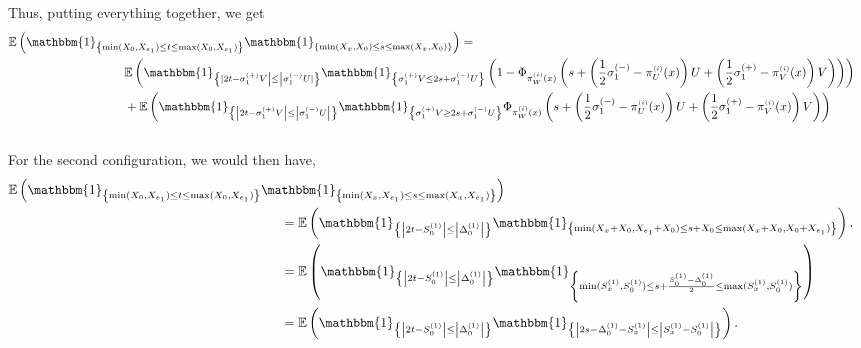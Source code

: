 \documentclass[12pt]{article}
\theoremstyle{Theorem}
\begin{document}
Thus, putting everything together, we get 
{\small 
\begin{align*}
\mathbb{E}\left(\mathbbm{1}_{\left\{\min(X_{\scriptscriptstyle 0}, X_{e_1}) \leq t \leq \max(X_{\scriptscriptstyle 0}, X_{e_1})\right\}}\mathbbm{1}_{\left\{\min(X_{x}, X_{0}) \leq s \leq \max(X_{x}, X_{0}) \right\}}\right) = \\
& \hspace{-10cm} \mathbb{E}\left(\mathbbm{1}_{\left\{|2t - \sigma^{(+)}_{1}V\right| \leq  \left|\sigma^{(-)}_{1}U|\right\}}\mathbbm{1}_{\left\{ \sigma^{(+)}_{1}V  \leq 2s + \sigma^{(-)}_{1}U\right\}} \left(1 - \Phi_{\pi^{\scriptscriptstyle(i)}_{W}(x) }\left(s + \left(\frac{1}{2}\sigma^{(-)}_{1}- \pi^{\scriptscriptstyle(i)}_{U}(x)\right)U  +  \left(\frac{1}{2}\sigma^{(+)}_{1}- \pi^{\scriptscriptstyle(i)}_{V}(x)\right)V\right)\right)\right)\\
& \hspace{-10cm}+ \mathbb{E}\left(\mathbbm{1}_{\left\{\left|2t - \sigma^{(+)}_{1}V\right|\leq  \left|\sigma^{(-)}_{1}U\right|\right\}}\mathbbm{1}_{\left\{ \sigma^{(+)}_{1}V  \geq 2s + \sigma^{(-)}_{1}U\right\}}\Phi_{\pi^{\scriptscriptstyle(i)}_{W}(x) }\left(s + \left(\frac{1}{2}\sigma^{(-)}_{1}- \pi^{\scriptscriptstyle(i)}_{U}(x)\right)U  +  \left(\frac{1}{2}\sigma^{(+)}_{1}- \pi^{\scriptscriptstyle(i)}_{V}(x)\right)V\right) \right)\\\
\end{align*}
}
For the second configuration, we would then have,
{\small
\begin{align*}
\mathbb{E}\left(\mathbbm{1}_{\left\{\min(X_{\scriptscriptstyle 0}, X_{e_1}) \leq t \leq \max(X_{\scriptscriptstyle 0}, X_{e_1})\right\}}\mathbbm{1}_{\left\{\min(X_{\scriptscriptstyle x}, X_{e_1}) \leq s \leq \max(X_{\scriptscriptstyle x}, X_{e_1}) \right\}}\right)\\
& \hspace{-6cm} = \mathbb{E}\left(\mathbbm{1}_{\left\{ \left|2t - S^{\scriptscriptstyle (1)}_{\scriptscriptstyle 0}\right| \leq \left|\Delta^{\scriptscriptstyle (1)}_{\scriptscriptstyle 0}\right|\right\}}\mathbbm{1}_{\left\{\min(X_{\scriptscriptstyle x}+ X_{0}, X_{e_1} + X_{0}) \leq s + X_{0}\leq \max(X_{\scriptscriptstyle x} + X_{0}, X_{0} + X_{e_1}) \right\}}\right). \\
& \hspace{-6cm} = \mathbb{E}\left(\mathbbm{1}_{\left\{ \left|2t - S^{\scriptscriptstyle (1)}_{\scriptscriptstyle 0}\right| \leq \left|\Delta^{\scriptscriptstyle (1)}_{\scriptscriptstyle 0}\right|\right\}}\mathbbm{1}_{\left\{\min(S^{(1)}_{x}, S^{(1)}_{0}) \leq s + \frac{S^{(1)}_{0} - \Delta^{(1)}_{0}}{2}\leq \max(S^{(1)}_{x}, S^{(1)}_{0}) \right\}}\right) \\
& \hspace{-6cm} = \mathbb{E}\left(\mathbbm{1}_{\left\{ \left|2t - S^{\scriptscriptstyle (1)}_{\scriptscriptstyle 0}\right| \leq \left|\Delta^{\scriptscriptstyle (1)}_{\scriptscriptstyle 0}\right|\right\}}\mathbbm{1}_{\left\{ \left|2s - \Delta^{(1)}_{0} -  S^{\scriptscriptstyle (1)}_{x}  \right| \leq \left|S^{\scriptscriptstyle (1)}_{x} - S^{\scriptscriptstyle (1)}_{0}\right|\right\}}\right). 
\end{align*}}
\end{document}
